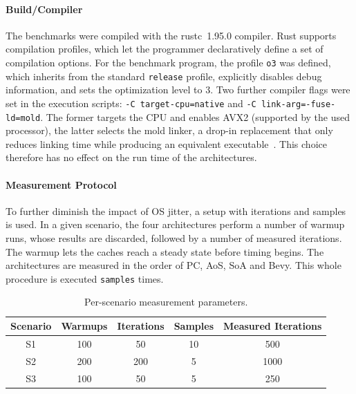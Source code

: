 \paragraph{Build/Compiler}
The benchmarks were compiled with the rustc~1.95.0 compiler. Rust supports compilation profiles, which let the programmer declaratively define a set of compilation options. For the benchmark program, the profile \texttt{o3} was defined, which inherits from the standard \texttt{release} profile, explicitly disables debug information, and sets the optimization level to \num{3}. Two further compiler flags were set in the execution scripts: {\texttt{-C~target-cpu=native}} and {\texttt{-C~link-arg=-fuse-ld=mold}}. The former targets the CPU and enables AVX2 (supported by the used processor), the latter selects the mold linker, a drop-in replacement that only reduces linking time while producing an equivalent executable~\cite{mold}. This choice therefore has no effect on the run time of the architectures.

\paragraph{Measurement Protocol}
To further diminish the impact of OS jitter, a setup with iterations and samples is used. In a given scenario, the four architectures perform a number of warmup runs, whose results are discarded, followed by a number of measured iterations. The warmup lets the caches reach a steady state before timing begins. The architectures are measured in the order of \ac{PC}, \ac{AoS}, \ac{SoA} and Bevy. This whole procedure is executed \texttt{samples} times. 

\begin{table}[htbp]
  \centering
  \begin{tabular}{ccccc}
    \toprule
    Scenario & Warmups    & Iterations & Samples  & Measured Iterations \\
    \midrule
    S1       & \num{100}  & \num{50}   & \num{10} & \num{500}\\
    S2       & \num{200}  & \num{200}  & \num{5}  & \num{1000}\\
    S3       & \num{100}  & \num{50}   & \num{5}  & \num{250}\\
    \bottomrule
  \end{tabular}
  \vspace{\medskipamount}
  \caption{Per-scenario measurement parameters.}
  \label{tab:methodology}
  \vspace{-\bigskipamount}
\end{table}


